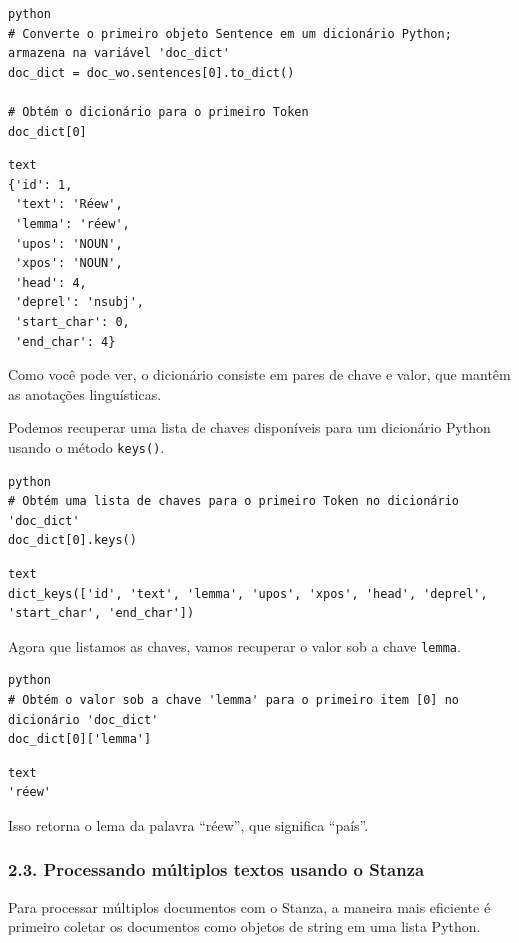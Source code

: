 \documentclass[
  brazilian,
]{article}
\begin{document}
\begin{verbatim}
python
# Converte o primeiro objeto Sentence em um dicionário Python; armazena na variável 'doc_dict'
doc_dict = doc_wo.sentences[0].to_dict()

# Obtém o dicionário para o primeiro Token
doc_dict[0]
\end{verbatim}

\begin{verbatim}
text
{'id': 1,
 'text': 'Réew',
 'lemma': 'réew',
 'upos': 'NOUN',
 'xpos': 'NOUN',
 'head': 4,
 'deprel': 'nsubj',
 'start_char': 0,
 'end_char': 4}
\end{verbatim}

Como você pode ver, o dicionário consiste em pares de chave e valor, que
mantêm as anotações linguísticas.

Podemos recuperar uma lista de chaves disponíveis para um dicionário
Python usando o método \texttt{keys()}.

\begin{verbatim}
python
# Obtém uma lista de chaves para o primeiro Token no dicionário 'doc_dict'
doc_dict[0].keys()
\end{verbatim}

\begin{verbatim}
text
dict_keys(['id', 'text', 'lemma', 'upos', 'xpos', 'head', 'deprel', 'start_char', 'end_char'])
\end{verbatim}

Agora que listamos as chaves, vamos recuperar o valor sob a chave
\texttt{lemma}.

\begin{verbatim}
python
# Obtém o valor sob a chave 'lemma' para o primeiro item [0] no dicionário 'doc_dict'
doc_dict[0]['lemma']
\end{verbatim}

\begin{verbatim}
text
'réew'
\end{verbatim}

Isso retorna o lema da palavra ``réew'', que significa ``país''.

\hypertarget{processando-muxfaltiplos-textos-usando-o-stanza}{%
\subsubsection{2.3. Processando múltiplos textos usando o
Stanza}\label{processando-muxfaltiplos-textos-usando-o-stanza}}

Para processar múltiplos documentos com o Stanza, a maneira mais
eficiente é primeiro coletar os documentos como objetos de string em uma
lista Python.
\end{document}
